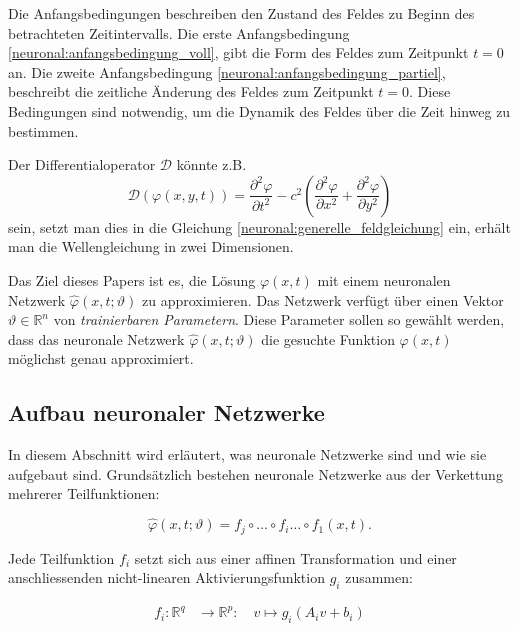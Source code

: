 Die Anfangsbedingungen beschreiben den Zustand des Feldes zu Beginn des betrachteten Zeitintervalls.
Die erste Anfangsbedingung \eqref{neuronal:anfangsbedingung_voll}, gibt die Form des Feldes zum Zeitpunkt $t = 0$ an.
Die zweite Anfangsbedingung \eqref{neuronal:anfangsbedingung_partiel}, beschreibt die zeitliche Änderung des Feldes zum Zeitpunkt $t = 0$.
Diese Bedingungen sind notwendig, um die Dynamik des Feldes über die Zeit hinweg zu bestimmen.

Der Differentialoperator $\mathcal{D}$ könnte z.B. 
\begin{equation}
    \mathcal{D}(\varphi(x, y, t)) = \frac{\partial^2 \varphi}{\partial t^2} - c^2 \left( \frac{\partial^2 \varphi}{\partial x^2} + \frac{\partial^2 \varphi}{\partial y^2} \right)
    \label{neuronal:bsp_differentialoperator}
\end{equation}
sein, setzt man dies in die Gleichung \eqref{neuronal:generelle_feldgleichung} ein, erhält man die Wellengleichung in zwei Dimensionen.

Das Ziel dieses Papers ist es, die Lösung $\varphi(x, t)$ mit einem neuronalen Netzwerk $\hat{\varphi}(x, t; \vartheta)$ zu approximieren.
Das Netzwerk verfügt über einen Vektor \( \vartheta \in \mathbb{R}^n \) von \emph{trainierbaren Parametern}.
Diese Parameter sollen so gewählt werden, dass das neuronale Netzwerk $\hat{\varphi}(x, t; \vartheta)$ die gesuchte Funktion $\varphi(x, t)$ möglichst genau approximiert.

\subsection{Aufbau neuronaler Netzwerke}\label{neuronal:subsection:struktur_nn}
In diesem Abschnitt wird erläutert, was neuronale Netzwerke sind und wie sie aufgebaut sind.
Grundsätzlich bestehen neuronale Netzwerke aus der Verkettung mehrerer Teilfunktionen:

\begin{equation}
    \hat{\varphi}(x, t; \vartheta) = f_j \circ \ldots \circ f_i \ldots \circ f_1(x, t).
    \label{neuronal:nn_ausformuliert}
\end{equation}

Jede Teilfunktion \( f_i \) setzt sich aus einer affinen Transformation und einer anschliessenden nicht-linearen Aktivierungsfunktion \( g_i \) zusammen:

\begin{align*}
    f_i\colon \mathbb{R}^q & \longrightarrow \mathbb{R}^p \colon \quad v \longmapsto g_i(A_i v + b_i)
\end{align*}

